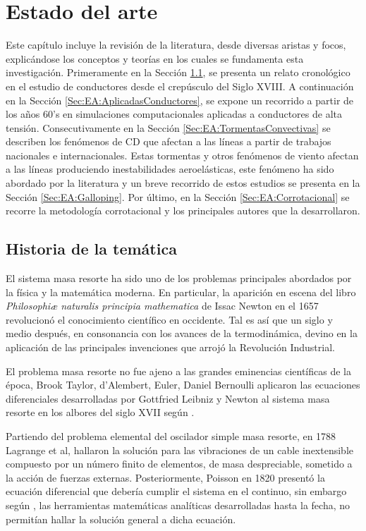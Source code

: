 \chapter{Estado del arte}\label{Cap:EstadoDelArte}\linenumbers

Este capítulo incluye la revisión de la literatura, desde diversas aristas y focos, explicándose los conceptos y teorías en los cuales se fundamenta esta investigación. Primeramente en la Sección \ref{Sec:EA:Historia}, se presenta un relato cronológico en el estudio de conductores desde el crepúsculo del Siglo XVIII. A continuación en la Sección \ref{Sec:EA:AplicadasConductores}, se expone un recorrido a partir de los años 60's en simulaciones computacionales aplicadas a conductores de alta tensión. Consecutivamente en la Sección \ref{Sec:EA:TormentasConvectivas} se describen los fenómenos de CD que afectan a las líneas a partir de trabajos nacionales e internacionales. Estas tormentas y otros fenómenos de viento afectan a las líneas produciendo inestabilidades aeroelásticas, este fenómeno ha sido abordado por la literatura y un breve recorrido de estos estudios se presenta en la Sección \ref{Sec:EA:Galloping}. Por último, en la Sección \ref{Sec:EA:Corrotacional} se recorre la metodología corrotacional y los principales autores que la desarrollaron. 

\section{Historia de la temática}\label{Sec:EA:Historia}
El sistema masa resorte ha sido uno de los problemas principales abordados por la física y la matemática moderna. En particular, la aparición en escena del libro \emph{Philosophiæ naturalis principia mathematica} de Issac Newton en el 1657 revolucionó el conocimiento científico en occidente. Tal es así que un siglo y medio después, en consonancia con los avances de la termodinámica, devino en la aplicación de las principales invenciones que arrojó la Revolución Industrial.

El problema masa resorte no fue ajeno a las grandes eminencias científicas de la época, Brook Taylor, d'Alembert, Euler, Daniel Bernoulli aplicaron las ecuaciones diferenciales desarrolladas por Gottfried Leibniz y Newton al sistema masa resorte en los albores del siglo XVII según \cite{Starossek1991}.  

Partiendo del problema elemental del oscilador simple masa resorte, en 1788 Lagrange et al, hallaron la solución para las vibraciones de un cable inextensible compuesto por un número finito de elementos, de masa despreciable, sometido a la acción de fuerzas externas. Posteriormente, Poisson en 1820 presentó la ecuación diferencial que debería cumplir el sistema en el continuo, sin embargo según \cite{Irvine1974}, las herramientas matemáticas analíticas desarrolladas hasta la fecha, no permitían hallar la solución general a dicha ecuación.


